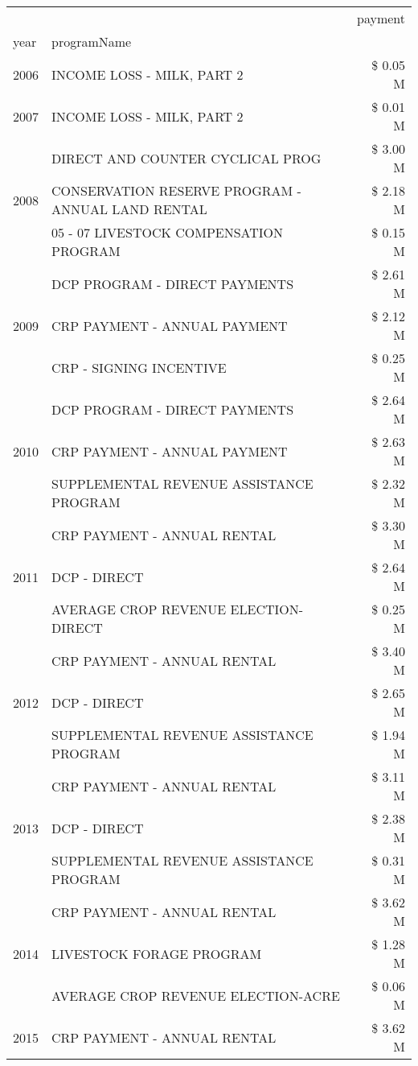 \begin{tabular}{llr}
\toprule
 &  & payment \\
year & programName &  \\
\midrule
2006 & INCOME LOSS - MILK, PART 2 & \$ 0.05 M \\
\cline{1-3}
2007 & INCOME LOSS - MILK, PART 2 & \$ 0.01 M \\
\cline{1-3}
\multirow[t]{3}{*}{2008} & DIRECT AND COUNTER CYCLICAL PROG & \$ 3.00 M \\
 & CONSERVATION RESERVE PROGRAM - ANNUAL LAND RENTAL & \$ 2.18 M \\
 & 05 - 07 LIVESTOCK COMPENSATION PROGRAM & \$ 0.15 M \\
\cline{1-3}
\multirow[t]{3}{*}{2009} & DCP PROGRAM - DIRECT PAYMENTS & \$ 2.61 M \\
 & CRP PAYMENT - ANNUAL PAYMENT & \$ 2.12 M \\
 & CRP - SIGNING INCENTIVE & \$ 0.25 M \\
\cline{1-3}
\multirow[t]{3}{*}{2010} & DCP PROGRAM - DIRECT PAYMENTS & \$ 2.64 M \\
 & CRP PAYMENT - ANNUAL PAYMENT & \$ 2.63 M \\
 & SUPPLEMENTAL REVENUE ASSISTANCE PROGRAM & \$ 2.32 M \\
\cline{1-3}
\multirow[t]{3}{*}{2011} & CRP PAYMENT - ANNUAL RENTAL & \$ 3.30 M \\
 & DCP - DIRECT & \$ 2.64 M \\
 & AVERAGE CROP REVENUE ELECTION-DIRECT & \$ 0.25 M \\
\cline{1-3}
\multirow[t]{3}{*}{2012} & CRP PAYMENT - ANNUAL RENTAL & \$ 3.40 M \\
 & DCP - DIRECT & \$ 2.65 M \\
 & SUPPLEMENTAL REVENUE ASSISTANCE PROGRAM & \$ 1.94 M \\
\cline{1-3}
\multirow[t]{3}{*}{2013} & CRP PAYMENT - ANNUAL RENTAL & \$ 3.11 M \\
 & DCP - DIRECT & \$ 2.38 M \\
 & SUPPLEMENTAL REVENUE ASSISTANCE PROGRAM & \$ 0.31 M \\
\cline{1-3}
\multirow[t]{3}{*}{2014} & CRP PAYMENT - ANNUAL RENTAL & \$ 3.62 M \\
 & LIVESTOCK FORAGE PROGRAM & \$ 1.28 M \\
 & AVERAGE CROP REVENUE ELECTION-ACRE & \$ 0.06 M \\
\cline{1-3}
\multirow[t]{3}{*}{2015} & CRP PAYMENT - ANNUAL RENTAL & \$ 3.62 M \\

\end{tabular}
